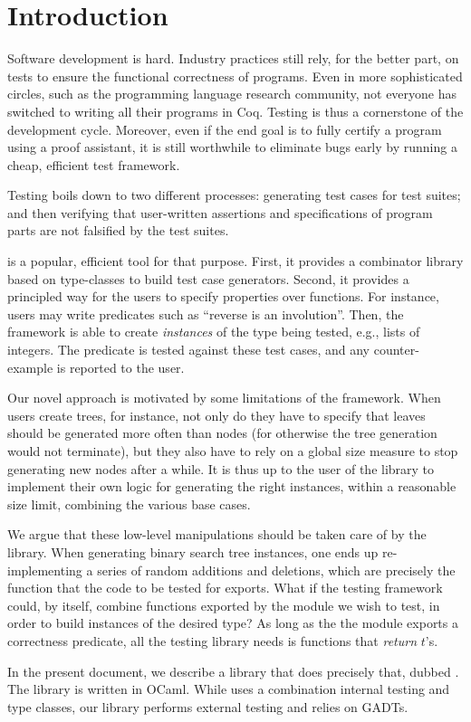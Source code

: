 \section{Introduction}
\label{sec:introduction}

Software development is hard. Industry practices still rely, for the better
part, on tests to ensure the functional correctness of programs. Even in more
sophisticated circles, such as the programming language research community, not
everyone has switched to writing all their programs in Coq. Testing is thus a
cornerstone of the development cycle. Moreover, even if the end goal is to fully
certify a program using a proof assistant, it is still worthwhile to eliminate
bugs early by running a cheap, efficient test framework.


Testing boils down to two different processes: generating test cases
for test suites; and then verifying that user-written assertions and
specifications of program parts are not falsified by the test suites.

\qcheck{} is a popular, efficient tool for that purpose. First, it
provides a combinator library based on type-classes to build test case
generators. Second, it provides a principled way for the users to
specify properties over functions. For instance, users may write
predicates such as ``reverse is an involution''. Then, the \qcheck
framework is able to create \emph{instances} of the type being tested,
e.g., lists of integers.  The predicate is tested against these test
cases, and any counter-example is reported to the user.

Our novel approach is motivated by some limitations of the \qcheck
framework.  When users create trees, for instance, not only do they
have to specify that leaves should be generated more often than nodes
(for otherwise the tree generation would not terminate), but they also
have to rely on a global size measure to stop generating new nodes
after a while. It is thus up to the user of the library to implement
their own logic for generating the right instances, within a
reasonable size limit, combining the various base cases.

We argue that these low-level manipulations should be taken care of by the
library. When generating binary search tree instances, one ends up
re-implementing a series of random additions and deletions, which are precisely
the function that the code to be tested for exports. What if the testing
framework could, by itself, combine functions exported by the module we wish to
test, in order to build instances of the desired type? As long as the the module
exports a correctness predicate, all the testing library needs is functions
that \emph{return} $t$'s.

In the present document, we describe a library that does precisely that, dubbed
\arti. The library is written in OCaml. While \qcheck uses a
combination internal testing and type classes, our library performs external
testing and relies on GADTs.
